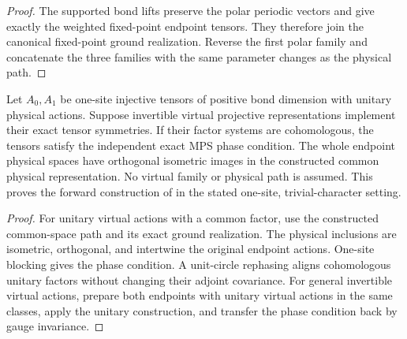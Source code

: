 \begin{proof}\leanok
    The supported bond lifts preserve the polar periodic vectors and
    give exactly the weighted fixed-point endpoint tensors. They
    therefore join the canonical fixed-point ground realization.
    Reverse the first polar family and concatenate the three families
    with the same parameter changes as the physical path.
\end{proof}

\begin{lemma}
    \label{thm:spt_exact_phase_forward}
    \leanok
    Let $A_0,A_1$ be one-site injective tensors of positive bond dimension
    with unitary physical actions. Suppose invertible virtual
    projective representations implement their exact tensor symmetries.
    If their factor systems are cohomologous, the tensors satisfy the
    independent exact MPS phase condition. The whole endpoint physical
    spaces have orthogonal isometric images in the constructed common
    physical representation. No virtual family or physical path is
    assumed. This proves the forward construction of
    \cite[Section~II.F.2]{Schuch2011Phases} in the stated one-site,
    trivial-character setting.
\end{lemma}

\begin{proof}\leanok
    For unitary virtual actions with a common factor, use the constructed
    common-space path and its exact ground realization. The physical
    inclusions are isometric, orthogonal, and intertwine the original
    endpoint actions. One-site blocking gives the phase condition.
    A unit-circle rephasing aligns cohomologous unitary factors without
    changing their adjoint covariance. For general invertible virtual
    actions, prepare both endpoints with unitary virtual actions in
    the same classes, apply the unitary construction, and transfer
    the phase condition back by gauge invariance.
\end{proof}

